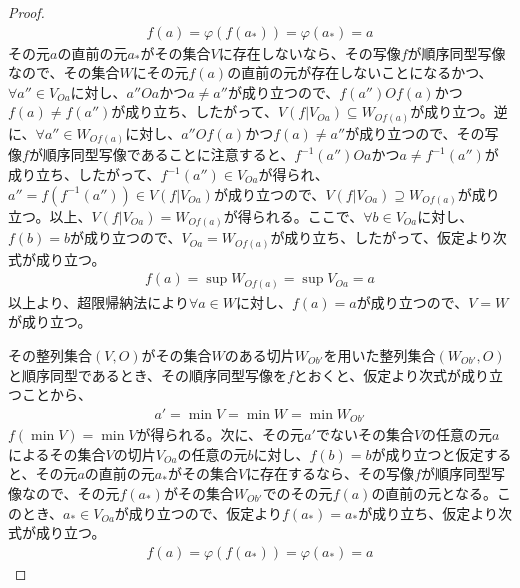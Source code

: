 \documentclass[dvipdfmx]{jsarticle}
\begin{document}
\begin{proof}
\begin{align*}
f(a) = \varphi\left( f\left( a_{*} \right) \right) = \varphi\left( a_{*} \right) = a
\end{align*}
その元$a$の直前の元$a_{*}$がその集合$V$に存在しないなら、その写像$f$が順序同型写像なので、その集合$W$にその元$f(a)$の直前の元が存在しないことになるかつ、$\forall a'' \in V_{Oa}$に対し、$a''Oa$かつ$a \neq a''$が成り立つので、$f\left( a'' \right)Of(a)$かつ$f(a) \neq f\left( a'' \right)$が成り立ち、したがって、$V\left( f|V_{Oa} \right) \subseteq W_{Of(a)}$が成り立つ。逆に、$\forall a'' \in W_{Of(a)}$に対し、$a''Of(a)$かつ$f(a) \neq a''$が成り立つので、その写像$f$が順序同型写像であることに注意すると、$f^{- 1}\left( a'' \right)Oa$かつ$a \neq f^{- 1}\left( a'' \right)$が成り立ち、したがって、$f^{- 1}\left( a'' \right) \in V_{Oa}$が得られ、$a'' = f\left( f^{- 1}\left( a'' \right) \right) \in V\left( f|V_{Oa} \right)$が成り立つので、$V\left( f|V_{Oa} \right) \supseteq W_{Of(a)}$が成り立つ。以上、$V\left( f|V_{Oa} \right) = W_{Of(a)}$が得られる。ここで、$\forall b \in V_{Oa}$に対し、$f(b) = b$が成り立つので、$V_{Oa} = W_{Of(a)}$が成り立ち、したがって、仮定より次式が成り立つ。
\begin{align*}
f(a) = \sup W_{Of(a)} = \sup V_{Oa} = a
\end{align*}
以上より、超限帰納法により$\forall a \in W$に対し、$f(a) = a$が成り立つので、$V = W$が成り立つ。\par
その整列集合$(V,O)$がその集合$W$のある切片$W_{Ob'}$を用いた整列集合$\left( W_{Ob'},O \right)$と順序同型であるとき、その順序同型写像を$f$とおくと、仮定より次式が成り立つことから、
\begin{align*}
a' = \min V = \min W = \min W_{Ob'}
\end{align*}
$f\left( \min V \right) = \min V$が得られる。次に、その元$a'$でないその集合$V$の任意の元$a$によるその集合$V$の切片$V_{Oa}$の任意の元$b$に対し、$f(b) = b$が成り立つと仮定すると、その元$a$の直前の元$a_{*}$がその集合$V$に存在するなら、その写像$f$が順序同型写像なので、その元$f\left( a_{*} \right)$がその集合$W_{Ob'}$でのその元$f(a)$の直前の元となる。このとき、$a_{*} \in V_{Oa}$が成り立つので、仮定より$f\left( a_{*} \right) = a_{*}$が成り立ち、仮定より次式が成り立つ。
\begin{align*}
f(a) = \varphi\left( f\left( a_{*} \right) \right) = \varphi\left( a_{*} \right) = a
\end{align*}

\end{proof}
\end{document}
